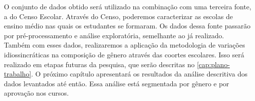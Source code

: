 O conjunto de dados obtido será utilizado na combinação com uma terceira fonte, a do Censo Escolar. Através do Censo, poderemos caracterizar as escolas de ensino médio nas quais os estudantes se formaram. Os dados dessa fonte passarão por pré-processamento e análise exploratória, semelhante ao já realizado. Também com esses dados, realizaremos a aplicação da metodologia de variações idiossincráticas na composição de gênero através das coortes escolares. Isso será realizado em etapas futuras da pesquisa, que serão descritas no \autoref{cap:plano-trabalho}. O próximo capítulo apresentará os resultados da análise descritiva dos dados levantados até então. Essa análise está segmentada por gênero e por aprovação nos cursos.
